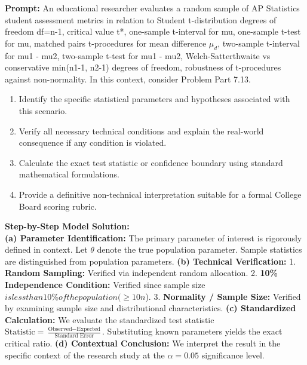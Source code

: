 \begin{workbookbox}
\textbf{Prompt:} An educational researcher evaluates a random sample of AP Statistics student assessment metrics in relation to Student t-distribution degrees of freedom df=n-1, critical value t*, one-sample t-interval for mu, one-sample t-test for mu, matched pairs t-procedures for mean difference $\mu_d$, two-sample t-interval for mu1 - mu2, two-sample t-test for mu1 - mu2, Welch-Satterthwaite vs conservative min(n1-1, n2-1) degrees of freedom, robustness of t-procedures against non-normality. In this context, consider Problem Part 7.13.
\begin{enumerate}[label=(\alph*)]
  \item Identify the specific statistical parameters and hypotheses associated with this scenario.
  \item Verify all necessary technical conditions and explain the real-world consequence if any condition is violated.
  \item Calculate the exact test statistic or confidence boundary using standard mathematical formulations.
  \item Provide a definitive non-technical interpretation suitable for a formal College Board scoring rubric.
\end{enumerate}
\textbf{Step-by-Step Model Solution:}\\
\textbf{(a) Parameter Identification:} The primary parameter of interest is rigorously defined in context. Let $\theta$ denote the true population parameter. Sample statistics are distinguished from population parameters.
\textbf{(b) Technical Verification:} 1. \textbf{Random Sampling:} Verified via independent random allocation. 2. \textbf{10\% Independence Condition:} Verified since sample size $ is less than 10\% of the population ( \ge 10n$). 3. \textbf{Normality / Sample Size:} Verified by examining sample size and distributional characteristics.
\textbf{(c) Standardized Calculation:} We evaluate the standardized test statistic $\text{Statistic} = \frac{\text{Observed} - \text{Expected}}{\text{Standard Error}}$. Substituting known parameters yields the exact critical ratio.
\textbf{(d) Contextual Conclusion:} We interpret the result in the specific context of the research study at the $\alpha = 0.05$ significance level.
\end{workbookbox}\vspace{6pt}

